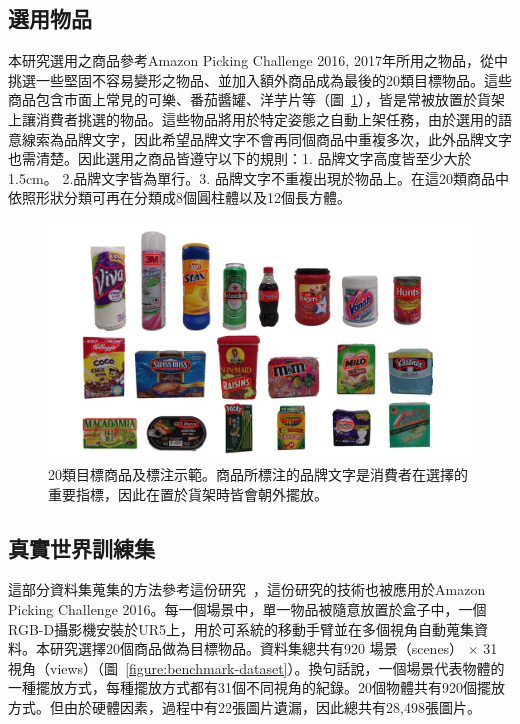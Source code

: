\subsection{選用物品}
本研究選用之商品參考Amazon Picking Challenge 2016, 2017年所用之物品，從中挑選一些堅固不容易變形之物品、並加入額外商品成為最後的20類目標物品。這些商品包含市面上常見的可樂、番茄醬罐、洋芋片等（圖~\ref{figure:20_products}），皆是常被放置於貨架上讓消費者挑選的物品。這些物品將用於特定姿態之自動上架任務，由於選用的語意線索為品牌文字，因此希望品牌文字不會再同個商品中重複多次，此外品牌文字也需清楚。因此選用之商品皆遵守以下的規則：1. 品牌文字高度皆至少大於1.5cm。 2.品牌文字皆為單行。3. 品牌文字不重複出現於物品上。在這20類商品中依照形狀分類可再在分類成8個圓柱體以及12個長方體。

\begin{figure}[ht]
	\centering
	\includegraphics[height=!, width=1.0\linewidth, keepaspectratio=true]
	{./figures/20_products.jpg}
  \caption{20類目標商品及標注示範。商品所標注的品牌文字是消費者在選擇的重要指標，因此在置於貨架時皆會朝外擺放。}
  \label{figure:20_products}
\end{figure}

\subsection{真實世界訓練集}
這部分資料集蒐集的方法參考這份研究~\cite{zeng2016multi}，這份研究的技術也被應用於Amazon Picking Challenge 2016。每一個場景中，單一物品被隨意放置於盒子中，一個RGB-D攝影機安裝於UR5上，用於可系統的移動手臂並在多個視角自動蒐集資料。本研究選擇20個商品做為目標物品。資料集總共有920 場景（scenes） $\times$ 31 視角（views）（圖~\ref{figure:benchmark-dataset}）。換句話說，一個場景代表物體的一種擺放方式，每種擺放方式都有31個不同視角的紀錄。20個物體共有920個擺放方式。但由於硬體因素，過程中有22張圖片遺漏，因此總共有28,498張圖片。

